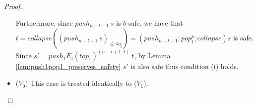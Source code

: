 \documentclass{article}
\newcommand{\prefixof}{\leqslant}
\theoremstyle{remark}
\theoremstyle{definition}
\begin{document}
\begin{proof}
\begin{itemize}
Furthermore, since $push_{n-l+1}\ s$ is $b$-safe, we have that
$t = collapse \left( (push_{n-l+1}\ s)_{\prefixof \lambda
\overline{\eta}_{b}} \right) = (push_{n-l+1};pop_1^p;collapse)
s$ is safe. Since $s' = push_1 E_i(top_1)^{(n-l+1,1)}\ t$, by
Lemma \ref{lem:push1pop1_preserves_safety} $s'$ is also safe
thus condition (i) holds.

\item ($V_0$) This case is treated identically to ($V_1$).
\end{itemize}
\end{proof}



\end{document}
